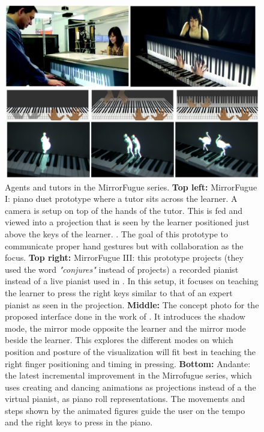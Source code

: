 \documentclass[manuscript,screen]{acmart}
\begin{document}
\begin{figure}[t]
    \centering
    \includegraphics[width=15cm]{figures/xiao.png}
    \caption{Agents and tutors in the MirrorFugue series. \textbf{Top left:} MirrorFugue I: piano duet prototype where a tutor sits across the learner. A camera is setup on top of the hands of the tutor. This is fed and viewed into a projection that is seen by the learner positioned just above the keys of the learner. \cite{xiao2010mirrorfugue}. The goal of this prototype to communicate proper hand gestures but with collaboration as the focus. \textbf{Top right:} MirrorFugue III: this prototype \cite{xiao2013mirrorfugue} projects (they used the word \textit{"conjures"} instead of projects) a recorded pianist instead of a live pianist used in \cite{xiao2010mirrorfugue}. In this setup, it focuses on teaching the learner to press the right keys similar to that of an expert pianist as seen in the projection. \textbf{Middle:} The concept photo for the proposed interface done in the work of \cite{xiao2010mirrorfugue}. It introduces the shadow mode, the mirror mode opposite the learner and the mirror mode beside the learner. This explores the different modes on which position and posture of the visualization will fit best in teaching the right finger positioning and timing in pressing.  \textbf{Bottom:} Andante: the latest incremental improvement in the Mirrofugue series, which uses creating and dancing animations as projections instead of a the virtual pianist, as piano roll representations. The movements and steps shown by the animated figures guide the user on the tempo and the right keys to press in the piano. }
    \label{fig:xiao}
\end{figure}
\end{document}
